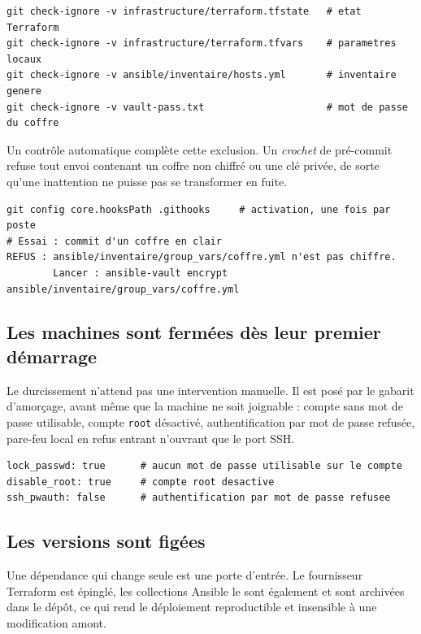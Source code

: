 \documentclass[11pt,a4paper]{article}
\newcommand{\ttb}[1]{\texttt{\small #1}}
\begin{document}
\begin{lstlisting}
git check-ignore -v infrastructure/terraform.tfstate   # etat Terraform
git check-ignore -v infrastructure/terraform.tfvars    # parametres locaux
git check-ignore -v ansible/inventaire/hosts.yml       # inventaire genere
git check-ignore -v vault-pass.txt                     # mot de passe du coffre
\end{lstlisting}

Un contrôle automatique complète cette exclusion. Un \emph{crochet} de
pré-commit refuse tout envoi contenant un coffre non chiffré ou une clé privée,
de sorte qu'une inattention ne puisse pas se transformer en fuite.

\begin{lstlisting}
git config core.hooksPath .githooks     # activation, une fois par poste
# Essai : commit d'un coffre en clair
REFUS : ansible/inventaire/group_vars/coffre.yml n'est pas chiffre.
        Lancer : ansible-vault encrypt ansible/inventaire/group_vars/coffre.yml
\end{lstlisting}

\subsection*{Les machines sont fermées dès leur premier démarrage}

Le durcissement n'attend pas une intervention manuelle. Il est posé par le
gabarit d'amorçage, avant même que la machine ne soit joignable : compte sans mot
de passe utilisable, compte \ttb{root} désactivé, authentification par mot de
passe refusée, pare-feu local en refus entrant n'ouvrant que le port SSH.

\begin{lstlisting}
lock_passwd: true      # aucun mot de passe utilisable sur le compte
disable_root: true     # compte root desactive
ssh_pwauth: false      # authentification par mot de passe refusee
\end{lstlisting}

\subsection*{Les versions sont figées}

Une dépendance qui change seule est une porte d'entrée. Le fournisseur Terraform
est épinglé, les collections Ansible le sont également et sont archivées dans le
dépôt, ce qui rend le déploiement reproductible et insensible à une modification
amont.
\end{document}
